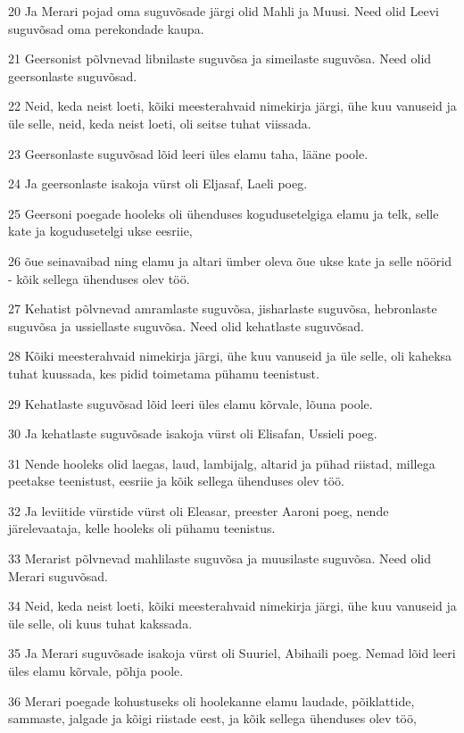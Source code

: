 \par 20 Ja Merari pojad oma suguvõsade järgi olid Mahli ja Muusi. Need olid Leevi suguvõsad oma perekondade kaupa.
\par 21 Geersonist põlvnevad libnilaste suguvõsa ja simeilaste suguvõsa. Need olid geersonlaste suguvõsad.
\par 22 Neid, keda neist loeti, kõiki meesterahvaid nimekirja järgi, ühe kuu vanuseid ja üle selle, neid, keda neist loeti, oli seitse tuhat viissada.
\par 23 Geersonlaste suguvõsad lõid leeri üles elamu taha, lääne poole.
\par 24 Ja geersonlaste isakoja vürst oli Eljasaf, Laeli poeg.
\par 25 Geersoni poegade hooleks oli ühenduses kogudusetelgiga elamu ja telk, selle kate ja kogudusetelgi ukse eesriie,
\par 26 õue seinavaibad ning elamu ja altari ümber oleva õue ukse kate ja selle nöörid - kõik sellega ühenduses olev töö.
\par 27 Kehatist põlvnevad amramlaste suguvõsa, jisharlaste suguvõsa, hebronlaste suguvõsa ja ussiellaste suguvõsa. Need olid kehatlaste suguvõsad.
\par 28 Kõiki meesterahvaid nimekirja järgi, ühe kuu vanuseid ja üle selle, oli kaheksa tuhat kuussada, kes pidid toimetama pühamu teenistust.
\par 29 Kehatlaste suguvõsad lõid leeri üles elamu kõrvale, lõuna poole.
\par 30 Ja kehatlaste suguvõsade isakoja vürst oli Elisafan, Ussieli poeg.
\par 31 Nende hooleks olid laegas, laud, lambijalg, altarid ja pühad riistad, millega peetakse teenistust, eesriie ja kõik sellega ühenduses olev töö.
\par 32 Ja leviitide vürstide vürst oli Eleasar, preester Aaroni poeg, nende järelevaataja, kelle hooleks oli pühamu teenistus.
\par 33 Merarist põlvnevad mahlilaste suguvõsa ja muusilaste suguvõsa. Need olid Merari suguvõsad.
\par 34 Neid, keda neist loeti, kõiki meesterahvaid nimekirja järgi, ühe kuu vanuseid ja üle selle, oli kuus tuhat kakssada.
\par 35 Ja Merari suguvõsade isakoja vürst oli Suuriel, Abihaili poeg. Nemad lõid leeri üles elamu kõrvale, põhja poole.
\par 36 Merari poegade kohustuseks oli hoolekanne elamu laudade, põiklattide, sammaste, jalgade ja kõigi riistade eest, ja kõik sellega ühenduses olev töö,

